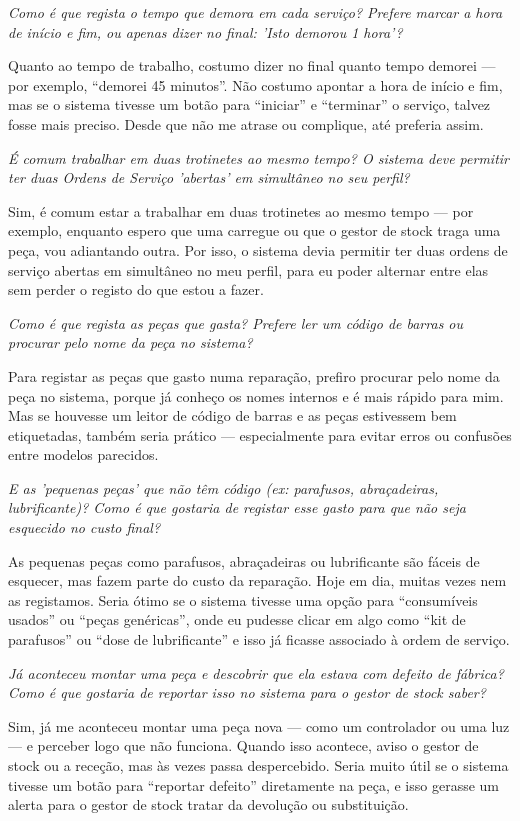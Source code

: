 \documentclass[11pt,a4paper]{article}
\newcommand{\pergunta}[1]{\item[P:] \textit{#1}}
\newcommand{\resposta}[1]{\item[R:] #1}
\begin{document}
\begin{transcription}
		\pergunta{Como é que regista o tempo que demora em cada serviço? Prefere marcar a hora de início e fim, ou apenas dizer no final: 'Isto demorou 1 hora'?}
		\resposta{Quanto ao tempo de trabalho, costumo dizer no final quanto tempo demorei — por exemplo, “demorei 45 minutos”. Não costumo apontar a hora de início e fim, mas se o sistema tivesse um botão para “iniciar” e “terminar” o serviço, talvez fosse mais preciso. Desde que não me atrase ou complique, até preferia assim.}
	
		\pergunta{É comum trabalhar em duas trotinetes ao mesmo tempo? O sistema deve permitir ter duas Ordens de Serviço 'abertas' em simultâneo no seu perfil?}
		\resposta{Sim, é comum estar a trabalhar em duas trotinetes ao mesmo tempo — por exemplo, enquanto espero que uma carregue ou que o gestor de stock traga uma peça, vou adiantando outra. Por isso, o sistema devia permitir ter duas ordens de serviço abertas em simultâneo no meu perfil, para eu poder alternar entre elas sem perder o registo do que estou a fazer.}
		
		\pergunta{Como é que regista as peças que gasta? Prefere ler um código de barras ou procurar pelo nome da peça no sistema?}
		\resposta{Para registar as peças que gasto numa reparação, prefiro procurar pelo nome da peça no sistema, porque já conheço os nomes internos e é mais rápido para mim. Mas se houvesse um leitor de código de barras e as peças estivessem bem etiquetadas, também seria prático — especialmente para evitar erros ou confusões entre modelos parecidos.}
		
		\pergunta{E as 'pequenas peças' que não têm código (ex: parafusos, abraçadeiras, lubrificante)? Como é que gostaria de registar esse gasto para que não seja esquecido no custo final?}
		\resposta{As pequenas peças como parafusos, abraçadeiras ou lubrificante são fáceis de esquecer, mas fazem parte do custo da reparação. Hoje em dia, muitas vezes nem as registamos. Seria ótimo se o sistema tivesse uma opção para “consumíveis usados” ou “peças genéricas”, onde eu pudesse clicar em algo como “kit de parafusos” ou “dose de lubrificante” e isso já ficasse associado à ordem de serviço.}
		
		\pergunta{Já aconteceu montar uma peça e descobrir que ela estava com defeito de fábrica? Como é que gostaria de reportar isso no sistema para o gestor de stock saber?}
		\resposta{Sim, já me aconteceu montar uma peça nova — como um controlador ou uma luz — e perceber logo que não funciona. Quando isso acontece, aviso o gestor de stock ou a receção, mas às vezes passa despercebido. Seria muito útil se o sistema tivesse um botão para “reportar defeito” diretamente na peça, e isso gerasse um alerta para o gestor de stock tratar da devolução ou substituição.}
		

\end{transcription}
\end{document}
